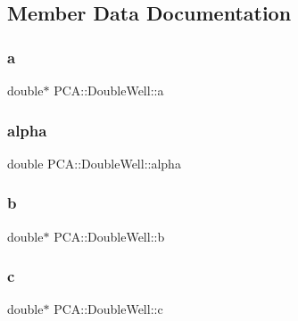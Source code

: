 \subsection{Member Data Documentation}
\hypertarget{class_p_c_a_1_1_double_well_a3304348b0bcb5faa5f9848f88546be36}{}\label{class_p_c_a_1_1_double_well_a3304348b0bcb5faa5f9848f88546be36} 
\subsubsection{\texorpdfstring{a}{a}}
{\footnotesize\ttfamily double$\ast$ P\+C\+A\+::\+Double\+Well\+::a\hspace{0.3cm}{\ttfamily [private]}}

\hypertarget{class_p_c_a_1_1_double_well_a658062287cb6dbe6b0827f2dde8e7995}{}\label{class_p_c_a_1_1_double_well_a658062287cb6dbe6b0827f2dde8e7995} 
\subsubsection{\texorpdfstring{alpha}{alpha}}
{\footnotesize\ttfamily double P\+C\+A\+::\+Double\+Well\+::alpha\hspace{0.3cm}{\ttfamily [private]}}

\hypertarget{class_p_c_a_1_1_double_well_afa6f0d1fbab6c1935dc45d21e5b26a87}{}\label{class_p_c_a_1_1_double_well_afa6f0d1fbab6c1935dc45d21e5b26a87} 
\subsubsection{\texorpdfstring{b}{b}}
{\footnotesize\ttfamily double$\ast$ P\+C\+A\+::\+Double\+Well\+::b\hspace{0.3cm}{\ttfamily [private]}}

\hypertarget{class_p_c_a_1_1_double_well_aef202905498e58de05d917566c380312}{}\label{class_p_c_a_1_1_double_well_aef202905498e58de05d917566c380312} 
\subsubsection{\texorpdfstring{c}{c}}
{\footnotesize\ttfamily double$\ast$ P\+C\+A\+::\+Double\+Well\+::c\hspace{0.3cm}{\ttfamily [private]}}

